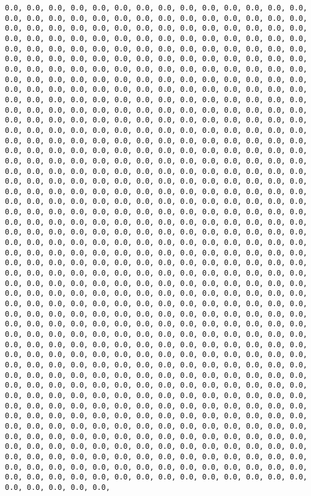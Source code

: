 \documentclass[11pt]{article}
\begin{document}
\begin{verbatim}
0.0, 0.0, 0.0, 0.0, 0.0, 0.0, 0.0, 0.0, 0.0, 0.0, 0.0, 0.0, 0.0, 0.0, 0.0, 0.0, 0.0, 0.0, 0.0, 0.0, 0.0, 0.0, 0.0, 0.0, 0.0, 0.0, 0.0, 0.0, 0.0, 0.0, 0.0, 0.0, 0.0, 0.0, 0.0, 0.0, 0.0, 0.0, 0.0, 0.0, 0.0, 0.0, 0.0, 0.0, 0.0, 0.0, 0.0, 0.0, 0.0, 0.0, 0.0, 0.0, 0.0, 0.0, 0.0, 0.0, 0.0, 0.0, 0.0, 0.0, 0.0, 0.0, 0.0, 0.0, 0.0, 0.0, 0.0, 0.0, 0.0, 0.0, 0.0, 0.0, 0.0, 0.0, 0.0, 0.0, 0.0, 0.0, 0.0, 0.0, 0.0, 0.0, 0.0, 0.0, 0.0, 0.0, 0.0, 0.0, 0.0, 0.0, 0.0, 0.0, 0.0, 0.0, 0.0, 0.0, 0.0, 0.0, 0.0, 0.0, 0.0, 0.0, 0.0, 0.0, 0.0, 0.0, 0.0, 0.0, 0.0, 0.0, 0.0, 0.0, 0.0, 0.0, 0.0, 0.0, 0.0, 0.0, 0.0, 0.0, 0.0, 0.0, 0.0, 0.0, 0.0, 0.0, 0.0, 0.0, 0.0, 0.0, 0.0, 0.0, 0.0, 0.0, 0.0, 0.0, 0.0, 0.0, 0.0, 0.0, 0.0, 0.0, 0.0, 0.0, 0.0, 0.0, 0.0, 0.0, 0.0, 0.0, 0.0, 0.0, 0.0, 0.0, 0.0, 0.0, 0.0, 0.0, 0.0, 0.0, 0.0, 0.0, 0.0, 0.0, 0.0, 0.0, 0.0, 0.0, 0.0, 0.0, 0.0, 0.0, 0.0, 0.0, 0.0, 0.0, 0.0, 0.0, 0.0, 0.0, 0.0, 0.0, 0.0, 0.0, 0.0, 0.0, 0.0, 0.0, 0.0, 0.0, 0.0, 0.0, 0.0, 0.0, 0.0, 0.0, 0.0, 0.0, 0.0, 0.0, 0.0, 0.0, 0.0, 0.0, 0.0, 0.0, 0.0, 0.0, 0.0, 0.0, 0.0, 0.0, 0.0, 0.0, 0.0, 0.0, 0.0, 0.0, 0.0, 0.0, 0.0, 0.0, 0.0, 0.0, 0.0, 0.0, 0.0, 0.0, 0.0, 0.0, 0.0, 0.0, 0.0, 0.0, 0.0, 0.0, 0.0, 0.0, 0.0, 0.0, 0.0, 0.0, 0.0, 0.0, 0.0, 0.0, 0.0, 0.0, 0.0, 0.0, 0.0, 0.0, 0.0, 0.0, 0.0, 0.0, 0.0, 0.0, 0.0, 0.0, 0.0, 0.0, 0.0, 0.0, 0.0, 0.0, 0.0, 0.0, 0.0, 0.0, 0.0, 0.0, 0.0, 0.0, 0.0, 0.0, 0.0, 0.0, 0.0, 0.0, 0.0, 0.0, 0.0, 0.0, 0.0, 0.0, 0.0, 0.0, 0.0, 0.0, 0.0, 0.0, 0.0, 0.0, 0.0, 0.0, 0.0, 0.0, 0.0, 0.0, 0.0, 0.0, 0.0, 0.0, 0.0, 0.0, 0.0, 0.0, 0.0, 0.0, 0.0, 0.0, 0.0, 0.0, 0.0, 0.0, 0.0, 0.0, 0.0, 0.0, 0.0, 0.0, 0.0, 0.0, 0.0, 0.0, 0.0, 0.0, 0.0, 0.0, 0.0, 0.0, 0.0, 0.0, 0.0, 0.0, 0.0, 0.0, 0.0, 0.0, 0.0, 0.0, 0.0, 0.0, 0.0, 0.0, 0.0, 0.0, 0.0, 0.0, 0.0, 0.0, 0.0, 0.0, 0.0, 0.0, 0.0, 0.0, 0.0, 0.0, 0.0, 0.0, 0.0, 0.0, 0.0, 0.0, 0.0, 0.0, 0.0, 0.0, 0.0, 0.0, 0.0, 0.0, 0.0, 0.0, 0.0, 0.0, 0.0, 0.0, 0.0, 0.0, 0.0, 0.0, 0.0, 0.0, 0.0, 0.0, 0.0, 0.0, 0.0, 0.0, 0.0, 0.0, 0.0, 0.0, 0.0, 0.0, 0.0, 0.0, 0.0, 0.0, 0.0, 0.0, 0.0, 0.0, 0.0, 0.0, 0.0, 0.0, 0.0, 0.0, 0.0, 0.0, 0.0, 0.0, 0.0, 0.0, 0.0, 0.0, 0.0, 0.0, 0.0, 0.0, 0.0, 0.0, 0.0, 0.0, 0.0, 0.0, 0.0, 0.0, 0.0, 0.0, 0.0, 0.0, 0.0, 0.0, 0.0, 0.0, 0.0, 0.0, 0.0, 0.0, 0.0, 0.0, 0.0, 0.0, 0.0, 0.0, 0.0, 0.0, 0.0, 0.0, 0.0, 0.0, 0.0, 0.0, 0.0, 0.0, 0.0, 0.0, 0.0, 0.0, 0.0, 0.0, 0.0, 0.0, 0.0, 0.0, 0.0, 0.0, 0.0, 0.0, 0.0, 0.0, 0.0, 0.0, 0.0, 0.0, 0.0, 0.0, 0.0, 0.0, 0.0, 0.0, 0.0, 0.0, 0.0, 0.0, 0.0, 0.0, 0.0, 0.0, 0.0, 0.0, 0.0, 0.0, 0.0, 0.0, 0.0, 0.0, 0.0, 0.0, 0.0, 0.0, 0.0, 0.0, 0.0, 0.0, 0.0, 0.0, 0.0, 0.0, 0.0, 0.0, 0.0, 0.0, 0.0, 0.0, 0.0, 0.0, 0.0, 0.0, 0.0, 0.0, 0.0, 0.0, 0.0, 0.0, 0.0, 0.0, 0.0, 0.0, 0.0, 0.0, 0.0, 0.0, 0.0, 0.0, 0.0, 0.0, 0.0, 0.0, 0.0, 0.0, 0.0, 0.0, 0.0, 0.0, 0.0, 0.0, 0.0, 0.0, 0.0, 0.0, 0.0, 0.0, 0.0, 0.0, 0.0, 0.0, 0.0, 0.0, 0.0, 0.0, 0.0, 0.0, 0.0, 0.0, 0.0, 0.0, 0.0, 0.0, 0.0, 0.0, 0.0, 0.0, 0.0, 0.0, 0.0, 0.0, 0.0, 0.0, 0.0, 0.0, 0.0, 0.0, 0.0, 0.0, 0.0, 0.0, 0.0, 0.0, 0.0, 0.0, 0.0, 0.0, 0.0, 0.0, 0.0, 0.0, 0.0, 0.0, 0.0, 0.0, 0.0, 0.0, 0.0, 0.0, 0.0, 0.0, 0.0, 0.0, 0.0, 0.0, 0.0, 0.0, 0.0, 0.0, 0.0, 0.0, 0.0, 0.0, 0.0, 0.0, 0.0, 0.0, 0.0, 0.0, 0.0, 0.0, 0.0, 0.0, 0.0, 0.0, 0.0, 0.0, 0.0, 0.0, 0.0, 0.0, 0.0, 0.0, 0.0, 0.0, 0.0, 0.0, 0.0, 0.0, 0.0, 0.0, 0.0, 0.0, 0.0, 0.0, 0.0, 0.0, 0.0, 0.0, 0.0, 0.0, 0.0, 
\end{verbatim}
\end{document}
